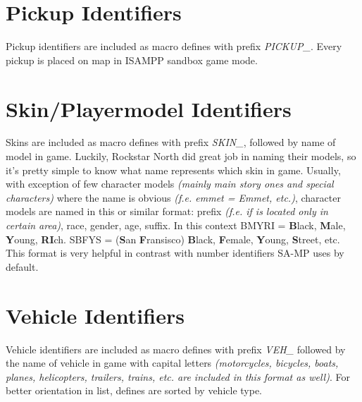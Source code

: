 \documentclass{article}
\begin{document}
\section{Pickup Identifiers}
Pickup identifiers are included as macro defines with prefix \textit{PICKUP\_}. Every pickup is placed on map in ISAMPP sandbox game mode.

\section{Skin/Playermodel Identifiers}
Skins are included as macro defines with prefix \textit{SKIN\_}, followed by name of model in game. Luckily, Rockstar North did great job in naming their models, so it's pretty simple to know what name represents which skin in game. Usually, with exception of few character models \textit{(mainly main story ones and special characters)} where the name is obvious \textit{(f.e. emmet = Emmet, etc.)}, character models are named in this or similar format: prefix \textit{(f.e. if is located only in certain area)}, race, gender, age, suffix. In this context BMYRI = \textbf{B}lack, \textbf{M}ale, \textbf{Y}oung, \textbf{RI}ch. SBFYS = (\textbf{S}an \textbf{F}ransisco) \textbf{B}lack, \textbf{F}emale, \textbf{Y}oung, \textbf{S}treet, etc. This format is very helpful in contrast with number identifiers SA-MP uses by default.

\section{Vehicle Identifiers}
Vehicle identifiers are included as macro defines with prefix \textit{VEH\_} followed by the name of vehicle in game with capital letters \textit{(motorcycles, bicycles, boats, planes, helicopters, trailers, trains, etc. are included in this format as well)}. For better orientation in list, defines are sorted by vehicle type.
\end{document}
